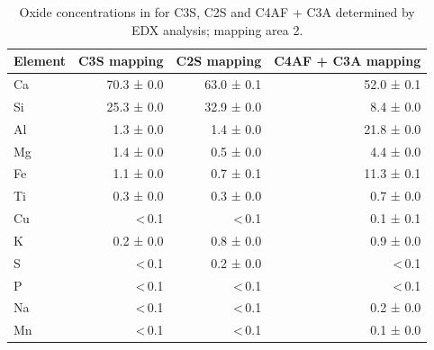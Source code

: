 \begin{table}[!htb]
	\caption{
		Oxide concentrations in \unit{\wtpercent} for \ac{C3S}, \ac{C2S} and \ac{C4AF} + \ac{C3A} determined by \ac{EDX} analysis; mapping area \num{2}.
	}
	\label{tab:laicpms1-area2}
	\begin{tabular*}{\linewidth}{@{\extracolsep{\fill}} lrrr}
	\toprule
	Element & \ac{C3S} mapping & \ac{C2S} mapping & \ac{C4AF} + \ac{C3A} mapping \\ \midrule
	Ca      & 70.3 ± 0.0         & 63.0 ± 0.1          & 52.0 ± 0.1            \\
	Si      & 25.3 ± 0.0         & 32.9 ± 0.0          & 8.4 ± 0.0             \\
	Al      & 1.3 ± 0.0          & 1.4 ± 0.0           & 21.8 ± 0.0            \\
	Mg      & 1.4 ± 0.0          & 0.5 ± 0.0           & 4.4 ± 0.0             \\
	Fe      & 1.1 ± 0.0          & 0.7 ± 0.1           & 11.3 ± 0.1            \\
	Ti      & 0.3 ± 0.0          & 0.3 ± 0.0           & 0.7 ± 0.0             \\
	Cu      & <\,0.1     & <\,0.1      & 0.1 ± 0.1             \\
	K       & 0.2 ± 0.0          & 0.8 ± 0.0           & 0.9 ± 0.0             \\
	S       & <\,0.1     & 0.2 ± 0.0           & <\,0.1        \\
	P       & <\,0.1     & <\,0.1      & <\,0.1        \\
	Na      & <\,0.1     & <\,0.1      & 0.2 ± 0.0             \\
	Mn      & <\,0.1     & <\,0.1      & 0.1 ± 0.0             \\ \bottomrule 
	\end{tabular*}
\end{table}

